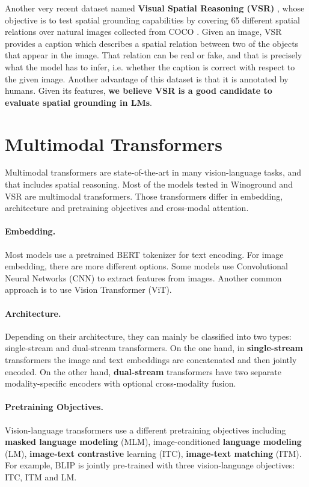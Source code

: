 Another very recent dataset named \textbf{Visual Spatial Reasoning (VSR)} \cite{liu2022visual}, whose objective is to test spatial grounding capabilities by covering 65 different spatial relations over natural images collected from COCO \cite{lin2014microsoft}. Given an image, VSR provides a caption which describes a spatial relation between two of the objects that appear in the image. That relation can be real or fake, and that is precisely what the model has to infer, i.e. whether the caption is correct with respect to the given image. Another advantage of this dataset is that it is annotated by humans. Given its features, \textbf{we believe VSR is a good candidate to evaluate spatial grounding in LMs}.

\section{Multimodal Transformers} \label{sec:multimodal_transformers}

Multimodal transformers are state-of-the-art in many vision-language tasks, and that includes spatial reasoning. Most of the models tested in Winoground \cite{thrush2022winoground} and VSR \cite{liu2022visual} are multimodal transformers. Those transformers differ in embedding, architecture and pretraining objectives and cross-modal attention.

\paragraph{Embedding.} Most models use a pretrained BERT tokenizer for text encoding. For image embedding, there are more different options. Some models use Convolutional Neural Networks (CNN) to extract features from images. Another common approach is to use Vision Transformer (ViT).

\paragraph{Architecture.} Depending on their architecture, they can mainly be classified into two types: single-stream and dual-stream transformers. On the one hand, in \textbf{single-stream} transformers the image and text embeddings are concatenated and then jointly encoded. On the other hand, \textbf{dual-stream} transformers have two separate modality-specific encoders with optional cross-modality fusion.

\paragraph{Pretraining Objectives.} Vision-language transformers use a different pretraining objectives including \textbf{masked language modeling} (MLM), image-conditioned \textbf{language modeling} (LM), \textbf{image-text contrastive} learning (ITC), \textbf{image-text matching} (ITM). For example, BLIP \cite{li2022blip} is jointly pre-trained with three vision-language objectives: ITC, ITM and LM.

